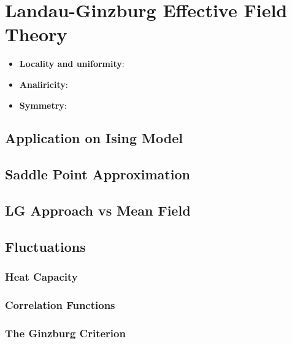 \section{Landau-Ginzburg Effective Field Theory}

\begin{itemize}
    \item \textbf{Locality and uniformity}:
    \item \textbf{Analiricity}:
    \item \textbf{Symmetry}:
\end{itemize}

\subsection{Application on Ising Model}

\subsection{Saddle Point Approximation}

\begin{remark}
\end{remark}

\subsection{LG Approach vs Mean Field}

\subsection{Fluctuations}

\subsubsection{Heat Capacity}

\subsubsection{Correlation Functions}

\subsubsection{The Ginzburg Criterion}